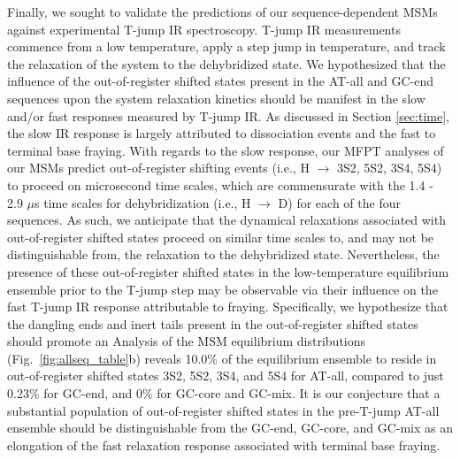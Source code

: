 \documentclass[journal=jpcbfk,manuscript=article]{achemso}
\newcommand*{\rood}[1]{{\color{red}{#1}}}
\begin{document}
Finally, we sought to validate the predictions of our sequence-dependent MSMs against experimental T-jump IR spectroscopy. T-jump IR measurements commence from a low temperature, apply a step jump in temperature, and track the relaxation of the system to the dehybridized state. We hypothesized that the influence of the out-of-register shifted states present in the AT-all and GC-end sequences upon the system relaxation kinetics should be manifest in the slow and/or fast responses measured by T-jump IR. As discussed in Section \ref{sec:time}, the slow IR response is largely attributed to dissociation events and the fast to terminal base fraying. With regards to the slow response, our MFPT analyses of our MSMs predict out-of-register shifting events (i.e., H $\rightarrow$ 3S2, 5S2, 3S4, 5S4) to proceed on microsecond time scales, which are commensurate with the 1.4 - 2.9 $\mu$s time scales for dehybridization (i.e., H $\rightarrow$ D) for each of the four sequences. As such, we anticipate that the dynamical relaxations associated with out-of-register shifted states proceed on similar time scales to, and may not be distinguishable from, the relaxation to the dehybridized state. Nevertheless, the presence of these out-of-register shifted states in the low-temperature equilibrium ensemble prior to the T-jump step may be observable via their influence on the fast T-jump IR response attributable to fraying. Specifically, we hypothesize that the dangling ends and inert tails present in the out-of-register shifted states should promote an \rood{elevated fraying response over the course of the relaxation that is distinct from that of in-register fraying. This heterogeneity of configurations should lead to heterogeneous dynamics, manifested in the observation of a more stretched relaxation over experimental time scales of 70-100 ns.} Analysis of the MSM equilibrium distributions (Fig.~\ref{fig:allseq_table}b) reveals 10.0\% of the equilibrium ensemble to reside in out-of-register shifted states 3S2, 5S2, 3S4, and 5S4 for AT-all, compared to just 0.23\% for GC-end, and 0\% for GC-core and GC-mix. It is our conjecture that a substantial population of out-of-register shifted states in the pre-T-jump AT-all ensemble should be distinguishable from the GC-end, GC-core, and GC-mix as an elongation of the fast relaxation response associated with terminal base fraying.
\end{document}
